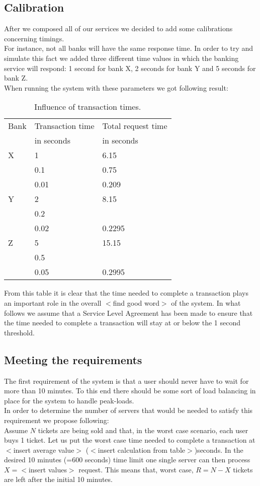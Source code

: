 \documentclass[10pt,a4paper,twocolumn]{article}
\begin{document}
\subsection{Calibration}
After we composed all of our services we decided to add some calibrations concerning timings.\\
For instance, not all banks will have the same response time. In order to try and simulate this fact we added three different time values in which the banking service will respond: 1 second for bank X, 2 seconds for bank Y and 5 seconds for bank Z. \\
When running the system with these parameters we got following result:\\
\newpage
\begin{table}[]
	\begin{tabular}{lll}
	Bank	& Transaction time & Total request time\\
		& in seconds	& in seconds	\\
	X	& 1 & 6.15 \\
		& 0.1 & 0.75 \\
		& 0.01 & 0.209 \\
	Y	& 2 & 8.15 \\
		& 0.2 &  \\
		& 0.02 & 0.2295 \\
	Z	& 5 & 15.15 \\
		& 0.5 &  \\
		& 0.05 & 0.2995
	\end{tabular}
	\caption{\label{tab:banking-time-influence}Influence of transaction times.}
\end{table}\noindent
From this table it is clear that the time needed to complete a transaction plays an important role in the overall $<$find good word$>$ of the system. In what follows we assume that a Service Level Agreement has been made to ensure that the time needed to complete a transaction will stay at or below the 1 second threshold.\\

\subsection{Meeting the requirements}
The first requirement of the system is that a user should never have to wait for more than 10 minutes. To this end there should be some sort of load balancing in place for the system to handle peak-loads.\\
In order to determine the number of servers that would be needed to satisfy this requirement we propose following:\\
Assume $N$ tickets are being sold and that, in the worst case scenario, each user buys 1 ticket. Let us put the worst case time needed to complete a transaction at $<$insert average value$>$ ($<$insert calculation from table$>$)seconds. In the desired 10 minutes (=600 seconds) time limit one single server can then process $X = <$insert values$>$ request. This means that, worst case, $R = N-X$ tickets are left after the initial 10 minutes.
\end{document}
